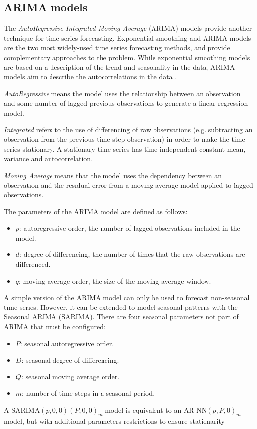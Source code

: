 \subsection{ARIMA models}
\label{subsec:arima_models}
The \emph{AutoRegressive Integrated Moving Average} (ARIMA) models provide another technique for time series forecasting. Exponential smoothing and ARIMA models are the two most widely-used time series forecasting methods, and provide complementary approaches to the problem. While exponential smoothing models are based on a description of the trend and seasonality in the data, ARIMA models aim to describe the autocorrelations in the data \cite{hyndman2018}.

\emph{AutoRegressive} means the model uses the relationship between an observation and some number of lagged previous observations to generate a linear regression model.

\emph{Integrated} refers to the use of differencing of raw observations (e.g. subtracting an observation from the previous time step observation) in order to make the time series stationary. A stationary time series has time-independent constant mean, variance and autocorrelation.

\emph{Moving Average} means that the model uses the dependency between an observation and the residual error from a moving average model applied to lagged observations.

The parameters of the ARIMA model are defined as follows:
\begin{itemize}
  \item \( p \): autoregressive order, the number of lagged observations included in the model.
  \item \( d \): degree of differencing, the number of times that the raw observations are differenced.
  \item \( q \): moving average order, the size of the moving average window.
\end{itemize}

A simple version of the ARIMA model can only be used to forecast non-seasonal time series. However, it can be extended to model seasonal patterns with the Seasonal ARIMA (SARIMA). There are four seasonal parameters not part of ARIMA that must be configured:
\begin{itemize}
  \item \( P \): seasonal autoregressive order.
  \item \( D \): seasonal degree of differencing.
  \item \( Q \): seasonal moving average order.
  \item \( m \): number of time steps in a seasonal period.
\end{itemize}
A \( \text{SARIMA}(p,0,0)(P,0,0)_m \) model is equivalent to an \( \text{AR-NN}(p,P,0)_m \) model, but with additional parameters restrictions to ensure stationarity

